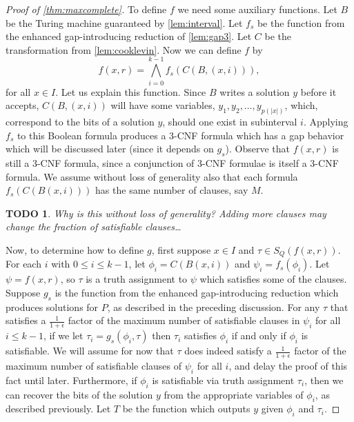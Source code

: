 \documentclass[]{article}
\theoremstyle{plain}
\newtheorem{todo}{TODO}
\theoremstyle{definition}
\begin{document}
\begin{proof}[Proof of \autoref{thm:maxcomplete}]
  To define $f$ we need some auxiliary functions.
  Let $B$ be the Turing machine guaranteed by \autoref{lem:interval}.
  Let $f_s$ be the function from the enhanced gap-introducing reduction of \autoref{lem:gap3}.
  Let $C$ be the transformation from \autoref{lem:cooklevin}.
  Now we can define $f$ by
  \begin{displaymath}
    f(x, r) = \bigwedge_{i = 0}^{k - 1}{f_s(C(B, (x, i)))},
  \end{displaymath}
  for all $x \in I$.
  Let us explain this function.
  Since $B$ writes a solution $y$ before it accepts, $C(B, (x, i))$ will have some variables, $y_1, y_2, \dotsc, y_{p(|x|)}$, which, correspond to the bits of a solution $y$, should one exist in subinterval $i$.
  Applying $f_s$ to this Boolean formula produces a 3-CNF formula which has a gap behavior which will be discussed later (since it depends on $g_s$).
  Observe that $f(x, r)$ is still a 3-CNF formula, since a conjunction of 3-CNF formulae is itself a 3-CNF formula.
  We assume without loss of generality also that each formula $f_s(C(B(x, i)))$ has the same number of clauses, say $M$.
  \begin{todo}
    Why is this without loss of generality?
    Adding more clauses may change the fraction of satisfiable clauses\ldots
  \end{todo}

  Now, to determine how to define $g$, first suppose $x \in I$ and $\tau \in S_Q(f(x, r))$.
  For each $i$ with $0 \leq i \leq k - 1$, let $\phi_i = C(B(x, i))$ and $\psi_i = f_s(\phi_i)$.
  Let $\psi = f(x, r)$, so $\tau$ is a truth assignment to $\psi$ which satisfies some of the clauses.
  Suppose $g_s$ is the function from the enhanced gap-introducing reduction which produces solutions for $P$, as described in the preceding discussion.
  For any $\tau$ that satisfies a $\frac{1}{1 + \epsilon}$ factor of the maximum number of satisfiable clauses in $\psi_i$ for all $i \leq k - 1$, if we let $\tau_i = g_s(\phi_i, \tau)$ then $\tau_i$ satisfies $\phi_i$ if and only if $\phi_i$ is satisfiable.
  We will assume for now that $\tau$ does indeed satisfy a $\frac{1}{1 + \epsilon}$ factor of the maximum number of satisfiable clauses of $\psi_i$ for all $i$, and delay the proof of this fact until later.
  Furthermore, if $\phi_i$ is satisfiable via truth assignment $\tau_i$, then we can recover the bits of the solution $y$ from the appropriate variables of $\phi_i$, as described previously.
  Let $T$ be the function which outputs $y$ given $\phi_i$ and $\tau_i$.


\end{proof}
\end{document}
